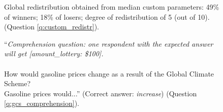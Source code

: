 \begin{figure}[h!]
    \caption[Median custom redistribution]{Global redistribution obtained from median custom parameters: 49\% of winners; 18\% of losers; degree of redistribution of 5 (out of 10). (Question \ref{q:custom_redistr}).
    }\label{fig:custom_redistr_median}
\end{figure} %


\begin{figure}[h!]
    \caption[Comprehension question on GCS]{``\textit{Comprehension question: one respondent with the expected answer will get [amount\_lottery: \$100].}\\\\How would gasoline prices change as a result of the Global Climate Scheme? \\Gasoline prices would...'' (Correct answer: \textit{increase}) (Question \ref{q:gcs_comprehension}).
    }\label{fig:gcs_comprehension}
\end{figure}

